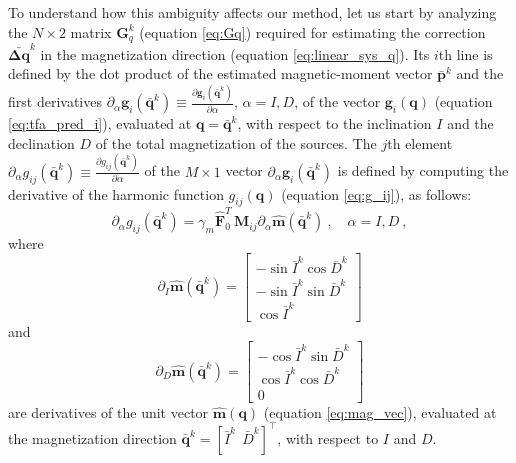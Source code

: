 To understand how this ambiguity affects our method, let us start by analyzing the 
$N \times 2$ matrix $\mathbf{G}_{q}^{k}$ (equation \ref{eq:Gq}) required for 
estimating the correction $\bar{\mathbf{\Delta q}}^{k}$ in the magnetization direction
(equation \ref{eq:linear_sys_q}). 
Its $i$th line is defined by the dot product of the estimated magnetic-moment vector 
$\bar{\mathbf{p}}^{k}$ and the first derivatives 
$\partial_{\alpha} \mathbf{g}_{i}(\bar{\mathbf{q}}^{k}) \equiv 
\frac{\partial \mathbf{g}_{i}(\bar{\mathbf{q}}^{k})}{\partial \alpha}$, $\alpha= I, D$, 
of the vector $\mathbf{g}_{i}(\mathbf{q})$ (equation \ref{eq:tfa_pred_i}),
evaluated at $\mathbf{q} = \bar{\mathbf{q}}^{k}$, with respect to the inclination 
$I$ and the declination $D$ of the total magnetization of the sources.
The $j$th element 
$\partial_{\alpha} g_{ij}(\bar{\mathbf{q}}^{k}) \equiv 
\frac{\partial g_{ij}(\bar{\mathbf{q}}^{k})}{\partial \alpha}$ 
of the $M \times 1$ vector $\partial_{\alpha} \mathbf{g}_{i}(\bar{\mathbf{q}}^{k})$ is defined
by computing the derivative of the harmonic function $g_{ij}(\mathbf{q})$ (equation \ref{eq:g_ij}), 
as follows:
\begin{equation}
\partial_{\alpha} g_{ij}(\bar{\mathbf{q}}^{k}) = 
\gamma_m  \hat{\mathbf{F}}_{0}^T \, \mathbf{M}_{ij} 
\partial_{\alpha} \hat{\mathbf{m}}(\bar{\mathbf{q}}^{k}) \: , \quad \alpha = I, D \: ,
\label{eq:D-alpha-gij}
\end{equation}
where
\begin{equation}
\partial_{I} \hat{\mathbf{m}}(\bar{\mathbf{q}}^{k}) = 
\begin{bmatrix}
	-\sin \bar{I}^{k} \cos \bar{D}^{k} \\
	-\sin \bar{I}^{k} \sin \bar{D}^{k} \\
	 \cos \bar{I}^{k}
\end{bmatrix}
\label{eq:D_mag_vec_inc}
\end{equation}
and
\begin{equation}
\partial_{D} \hat{\mathbf{m}}(\bar{\mathbf{q}}^{k}) = 
\begin{bmatrix}
	-\cos \bar{I}^{k} \sin \bar{D}^{k} \\
	 \cos \bar{I}^{k} \cos \bar{D}^{k} \\
	 0
\end{bmatrix}
\label{eq:D_mag_vec_dec}
\end{equation}
are derivatives of the unit vector $\hat{\mathbf{m}}(\mathbf{q})$ (equation \ref{eq:mag_vec}), 
evaluated at the magnetization direction 
$\bar{\mathbf{q}}^{k} = \left[ \bar{I}^{k} \:\: \bar{D}^{k} \right]^{\top}$, 
with respect to $I$ and $D$.

